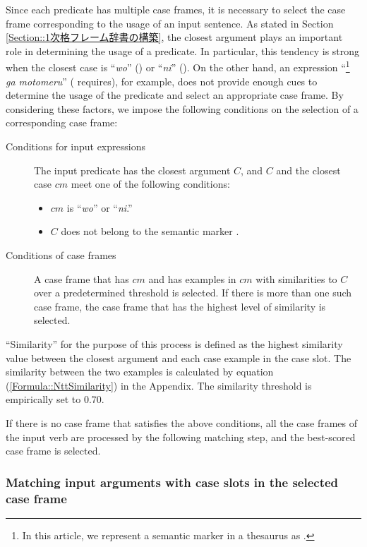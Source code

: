 \documentclass[english]{jnlp_1.4_rep}
\newcommand{\sm}[1]{}
\newcommand{\acc}{}
\newcommand{\dat}{}
\begin{document}
Since each predicate has multiple case frames, it is necessary to select
the case frame corresponding to the usage of an input sentence. As
stated in Section \ref{Section::1次格フレーム辞書の構築}, the closest
argument plays an important role in determining the usage of a
predicate.  In particular, this tendency is strong when the closest case
is ``\textit{wo}'' (\acc) or ``\textit{ni}'' (\dat). On the other hand, an expression
``\sm{agent}\footnote{In this article, we represent a semantic marker in
a thesaurus as \sm{}.} \textit{ga motomeru}'' (\sm{agent} requires), for example,
does not provide enough cues to determine the usage of the predicate and
select an appropriate case frame. By considering these factors, we
impose the following conditions on the selection of a corresponding case
frame:

\begin{description}
 \item[Conditions for input expressions] The input predicate has the
	    closest argument $C$, and $C$ and the closest case
	    $cm$ meet one of the following conditions:
	    \label{格フレーム選択アルゴリズム::直前条件}
	    \begin{itemize}
	     \item $cm$ is ``\textit{wo}'' or ``\textit{ni}.''
	     \item $C$ does not belong to the semantic marker \sm{agent}.
	    \end{itemize}
 \item[Conditions of case frames] A case frame that has $cm$ and has
	    examples in $cm$ with similarities to $C$ over a
	    predetermined threshold is
	    selected. If there is more than one such case frame, the
	    case frame that has the highest level of similarity is selected.
\end{description}


``Similarity'' for the purpose of this process is defined as the highest
similarity value between the closest argument and each case example in the case
slot. The similarity between the two examples is calculated by equation
(\ref{Formula::NttSimilarity}) in the Appendix. The similarity threshold is
empirically set to 0.70.

If there is no case frame that satisfies the above conditions, all the
case frames of the input verb are processed by the following matching
step, and the best-scored case frame is selected.


\subsubsection*{Matching input arguments with case slots in the
selected case frame}
\label{Section::MatchingInputWIthCaseFrames}
\end{document}
